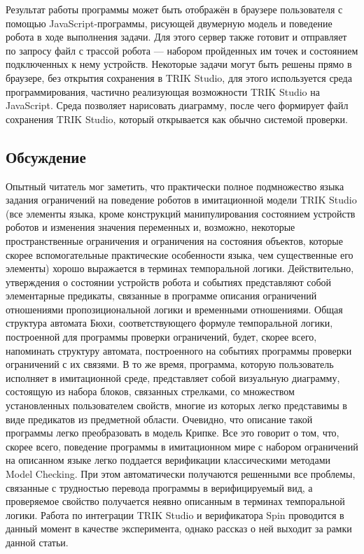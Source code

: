 ﻿\documentclass[conference]{IEEEtran}
\begin{document}
Результат работы программы может быть отображён в браузере пользователя с помощью 
JavaScript-программы, рисующей двумерную модель и поведение робота в ходе выполнения 
задачи. Для этого сервер также готовит и отправляет по запросу файл с трассой робота 
--- набором пройденных им точек и состоянием подключенных к нему устройств. Некоторые 
задачи могут быть решены прямо в браузере, без открытия сохранения в TRIK Studio, для 
этого используется среда программирования, частично реализующая возможности TRIK Studio 
на JavaScript. Среда позволяет нарисовать диаграмму, после чего формирует файл сохранения 
TRIK Studio, который открывается как обычно системой проверки.

\subsection{Обсуждение}
Опытный читатель мог заметить, что практически полное подмножество языка задания ограничений 
на поведение роботов в имитационной модели TRIK Studio (все элементы языка, кроме 
конструкций манипулирования состоянием устройств роботов и изменения значения переменных 
и, возможно, некоторые пространственные ограничения и ограничения на состояния объектов, 
которые скорее вспомогательные практические особенности языка, чем существенные его 
элементы) хорошо выражается в терминах темпоральной логики. Действительно, утверждения 
о состоянии устройств робота и событиях представляют собой элементарные предикаты, 
связанные в программе описания ограничений отношениями пропозициональной логики и временными 
отношениями. Общая структура автомата Бюхи, соответствующего формуле темпоральной логики, 
построенной для программы проверки ограничений, будет, скорее всего, напоминать структуру 
автомата, построенного на событиях программы проверки ограничений с их связями. В то же 
время, программа, которую пользователь исполняет в имитационной среде, представляет 
собой визуальную диаграмму, состоящую из набора блоков, связанных стрелками, со множеством 
установленных пользователем свойств, многие из которых легко представимы в виде предикатов 
из предметной области. Очевидно, что описание такой программы легко преобразовать в модель 
Крипке. Все это говорит о том, что, скорее всего, поведение программы в имитационном 
мире с набором ограничений на описанном языке легко поддается верификации классическими 
методами Model Checking. При этом автоматически получаются решенными все проблемы, 
связанные с трудностью перевода программы в верифицируемый вид, а проверяемое свойство 
получается неявно описанным в терминах темпоральной логики. Работа по интеграции TRIK Studio 
и верификатора Spin проводится в данный момент в качестве эксперимента, однако рассказ 
о ней выходит за рамки данной статьи.
\end{document}
